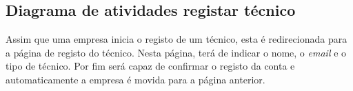 







\newpage

\subsection{Diagrama de atividades registar técnico}

Assim que uma empresa inicia o registo de um técnico, esta é redirecionada para a página de registo do técnico. Nesta página, terá de indicar o nome, o \textit{email} e o tipo de técnico. Por fim será capaz de confirmar o registo da conta e automaticamente a empresa é movida para a página anterior.

